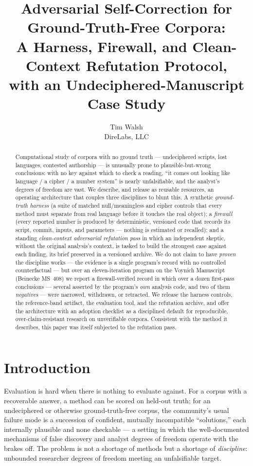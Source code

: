 \documentclass[11pt]{article}
\title{\textbf{Adversarial Self-Correction for Ground-Truth-Free Corpora:\\
A Harness, Firewall, and Clean-Context Refutation Protocol,\\
with an Undeciphered-Manuscript Case Study}}
\author{Tim Walsh \\ \small DireLabs, LLC}
\date{}
\begin{document}
\maketitle

\begin{abstract}
\noindent Computational study of corpora with no ground truth --- undeciphered scripts, lost
languages, contested authorship --- is unusually prone to plausible-but-wrong conclusions:
with no key against which to check a reading, ``it comes out looking like language / a cipher /
a number system'' is nearly unfalsifiable, and the analyst's degrees of freedom are vast. We
describe, and release as reusable resources, an operating architecture that couples three
disciplines to blunt this. A synthetic \emph{ground-truth harness} (a suite of matched
null/meaningless and cipher controls that every method must separate from real language before
it touches the real object); a \emph{firewall} (every reported number is produced by
deterministic, versioned code that records its script, commit, inputs, and parameters --- nothing
is estimated or recalled); and a standing \emph{clean-context adversarial refutation pass} in
which an independent skeptic, without the original analysis's context, is tasked to build the
strongest case against each finding, its brief preserved in a versioned archive. We do not claim
to have \emph{proven} the discipline works --- the evidence is a single program's record with no
controlled counterfactual --- but over an eleven-iteration program on the Voynich Manuscript
(Beinecke MS~408) we report a firewall-verified record in which over a dozen first-pass
conclusions --- several asserted by the program's \emph{own} analysis code, and two of them
\emph{negatives} --- were narrowed, withdrawn, or retracted. We release the harness controls, the
reference-band artifact, the evaluation tool, and the refutation archive, and offer the
architecture with an adoption checklist as a disciplined default for reproducible,
over-claim-resistant research on unverifiable corpora. Consistent with the method it describes,
this paper was itself subjected to the refutation pass.
\end{abstract}

\section{Introduction}
Evaluation is hard when there is nothing to evaluate against. For a corpus with a recoverable
answer, a method can be scored on held-out truth; for an undeciphered or otherwise
ground-truth-free corpus, the community's usual failure mode is a succession of confident,
mutually incompatible ``solutions,'' each internally plausible and none checkable --- a
setting in which the well-documented mechanisms of false discovery and analyst degrees of
freedom \citep{ioannidis2005why,simmons2011false,gelman2013garden} operate with the brakes off. The problem
is not a shortage of methods but a shortage of \emph{discipline}: unbounded researcher degrees
of freedom meeting an unfalsifiable target.
\end{document}
